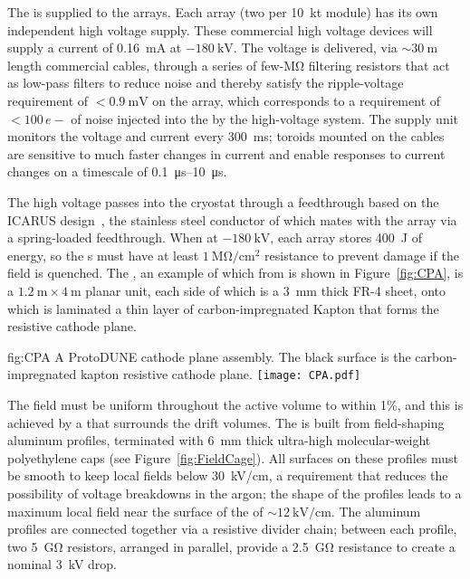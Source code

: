 The  is supplied to the  arrays. Each  array (two per \SI{10}{\kilo\tonne} module) has its own independent high voltage supply. These commercial high voltage devices will supply a current of \SI{0.16}{\milli\ampere} at $-\SI{180}{\kilo\volt}$. The voltage is delivered, via $\sim\!\SI{30}{\meter}$ length commercial cables, through a series of few-\si{\mega\ohm} filtering resistors that act as low-pass filters to reduce noise and thereby satisfy the ripple-voltage requirement of $<\!\SI{0.9}{\milli\volt}$ on the  array, which corresponds to a requirement of $<\!100\,e{-}$ of noise injected into the  by the high-voltage system. The supply unit monitors the voltage and current every \SI{300}{\milli\second}; toroids mounted on the cables are sensitive to much faster changes in current and enable responses to current changes on a timescale of \SIrange{0.1}{10}{\micro\second}.

The high voltage passes into the cryostat through a feedthrough based on the ICARUS design~\cite{Icarus-T600}, the stainless steel conductor of which mates with the  array via a spring-loaded feedthrough.
When at $-\SI{180}{\kilo\volt}$, each  array stores \SI{400}{\joule} of energy, so the s must have at least $\SI{1}{\mega\ohm/\cm^{2}}$ resistance to prevent damage if the field is quenched. The , an example of which from  is shown in Figure~\ref{fig:CPA}, is a $\SI{1.2}{\meter}\times\SI{4}{\meter}$ planar unit, each side of which is a \SI{3}{\mm} thick FR-4 sheet, onto which is laminated a thin layer of carbon-impregnated Kapton that forms the resistive cathode plane.

\begin{dunefigure}{fig:CPA}
{A ProtoDUNE cathode plane assembly. The black surface is the carbon-impregnated kapton resistive cathode plane.}
\texttt{[image: CPA.pdf]}
\end{dunefigure}

The field must be uniform throughout the active  volume to within 1\%, and this is achieved by a  that surrounds the drift volumes. The  is built from field-shaping aluminum profiles, terminated with \SI{6}{\mm} thick ultra-high molecular-weight polyethylene caps (see Figure~\ref{fig:FieldCage}). All surfaces on these profiles must be smooth to keep local fields below \SI{30}{\kilo\volt/\cm}, a requirement that reduces the possibility of voltage breakdowns in the argon; the shape of the profiles leads to a maximum local field near the surface of the  of $\sim\!\SI{12}{\kilo\volt/\cm}$. The aluminum profiles are connected together via a resistive divider chain; between each profile, two \SI{5}{\giga\ohm} resistors, arranged in parallel, provide a \SI{2.5}{\giga\ohm} resistance to create a nominal \SI{3}{\kilo\volt} drop.

